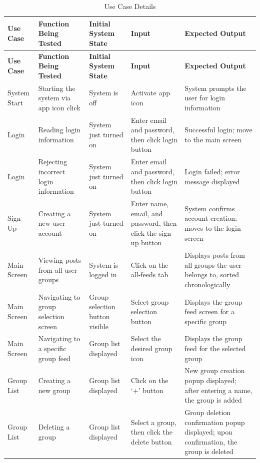 \renewcommand{\arraystretch}{1.4} %
\setlength{\tabcolsep}{4pt} %
\begin{longtable}{|>{\centering\arraybackslash}p{}|>{\centering\arraybackslash}p{}|>{\centering\arraybackslash}p{}|>{\centering\arraybackslash}p{}|>{\centering\arraybackslash}p{}|}
\caption{Use Case Details} \\ %
\hline
\textbf{Use Case} & \textbf{Function Being Tested} & \textbf{Initial System State} & \textbf{Input} & \textbf{Expected Output} \\ \hline
\endfirsthead
\hline
\textbf{Use Case} & \textbf{Function Being Tested} & \textbf{Initial System State} & \textbf{Input} & \textbf{Expected Output} \\ \hline
\endhead
\hline
\endfoot
System Start & Starting the system via app icon click & System is off & Activate app icon & System prompts the user for login information \\ \hline
Login & Reading login information & System just turned on & Enter email and password, then click login button & Successful login; move to the main screen \\ \hline
Login & Rejecting incorrect login information & System just turned on & Enter email and password, then click login button & Login failed; error message displayed \\ \hline
Sign-Up & Creating a new user account & System just turned on & Enter name, email, and password, then click the sign-up button & System confirms account creation; moves to the login screen \\ \hline
Main Screen & Viewing posts from all user groups & System is logged in & Click on the all-feeds tab & Displays posts from all groups the user belongs to, sorted chronologically \\ \hline
Main Screen & Navigating to group selection screen & Group selection button visible & Select group selection button & Displays the group feed screen for a specific group \\ \hline
Main Screen & Navigating to a specific group feed & Group list displayed & Select the desired group icon & Displays the group feed for the selected group \\ \hline
Group List & Creating a new group & Group list displayed & Click on the ‘+’ button & New group creation popup displayed; after entering a name, the group is added \\ \hline
Group List & Deleting a group & Group list displayed & Select a group, then click the delete button & Group deletion confirmation popup displayed; upon confirmation, the group is deleted \\ \hline

\end{longtable}
